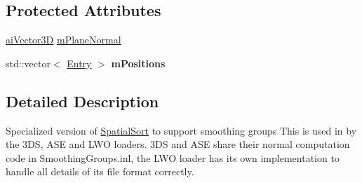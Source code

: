 \subsection*{Protected Attributes}
\begin{DoxyCompactItemize}
\item 
\hyperlink{structai_vector3_d}{ai\+Vector3\+D} \hyperlink{class_assimp_1_1_s_g_spatial_sort_a8b804cf9b91af01eedebca7d878cd3df}{m\+Plane\+Normal}
\item 
\hypertarget{class_assimp_1_1_s_g_spatial_sort_ae259b68b3d5d1161dcf2d9d71e605cd4}{std\+::vector$<$ \hyperlink{struct_assimp_1_1_s_g_spatial_sort_1_1_entry}{Entry} $>$ {\bfseries m\+Positions}}\label{class_assimp_1_1_s_g_spatial_sort_ae259b68b3d5d1161dcf2d9d71e605cd4}

\end{DoxyCompactItemize}


\subsection{Detailed Description}
Specialized version of \hyperlink{class_assimp_1_1_spatial_sort}{Spatial\+Sort} to support smoothing groups This is used in by the 3\+D\+S, A\+S\+E and L\+W\+O loaders. 3\+D\+S and A\+S\+E share their normal computation code in Smoothing\+Groups.\+inl, the L\+W\+O loader has its own implementation to handle all details of its file format correctly. 

